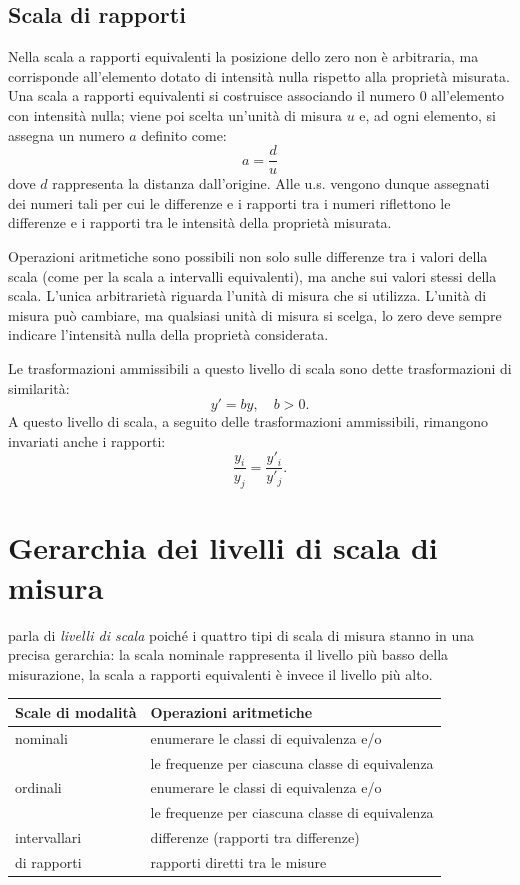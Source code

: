\documentclass[
]{memoir}
\theoremstyle{definition}
\theoremstyle{definition}
\theoremstyle{definition}
\theoremstyle{definition}
\theoremstyle{remark}
\begin{document}
\hypertarget{scala-di-rapporti}{%
\subsection{Scala di rapporti}\label{scala-di-rapporti}}

Nella scala a rapporti equivalenti la posizione dello zero non è
arbitraria, ma corrisponde all'elemento dotato di intensità nulla
rispetto alla proprietà misurata. Una scala a rapporti equivalenti si
costruisce associando il numero 0 all'elemento con intensità nulla;
viene poi scelta un'unità di misura \(u\) e, ad ogni elemento, si assegna
un numero \(a\) definito come: \[a = \frac{d}{u}\] dove \(d\) rappresenta la
distanza dall'origine. Alle u.s. vengono dunque assegnati dei numeri
tali per cui le differenze e i rapporti tra i numeri riflettono le
differenze e i rapporti tra le intensità della proprietà misurata.

Operazioni aritmetiche sono possibili non solo sulle differenze tra i
valori della scala (come per la scala a intervalli equivalenti), ma
anche sui valori stessi della scala. L'unica arbitrarietà riguarda
l'unità di misura che si utilizza. L'unità di misura può cambiare, ma
qualsiasi unità di misura si scelga, lo zero deve sempre indicare
l'intensità nulla della proprietà considerata.

Le trasformazioni ammissibili a questo livello di scala sono dette
trasformazioni di similarità: \[y' = by, \quad b > 0.\] A questo livello
di scala, a seguito delle trasformazioni ammissibili, rimangono
invariati anche i rapporti: \[\frac{y_i}{y_j} = \frac{y'_i}{y'_j}.\]

\hypertarget{gerarchia-dei-livelli-di-scala-di-misura}{%
\section{Gerarchia dei livelli di scala di misura}\label{gerarchia-dei-livelli-di-scala-di-misura}}

\citet{stevens46} parla di \emph{livelli di scala} poiché i quattro tipi di scala di
misura stanno in una precisa gerarchia: la scala nominale rappresenta il
livello più basso della misurazione, la scala a rapporti equivalenti è
invece il livello più alto.

\begin{longtable}[]{@{}ll@{}}
\toprule
Scale di modalità & Operazioni aritmetiche \\
\midrule
\endhead
nominali & enumerare le classi di equivalenza e/o \\
& le frequenze per ciascuna classe di equivalenza \\
ordinali & enumerare le classi di equivalenza e/o \\
& le frequenze per ciascuna classe di equivalenza \\
intervallari & differenze (rapporti tra differenze) \\
di rapporti & rapporti diretti tra le misure \\
\bottomrule
\end{longtable}
\end{document}
